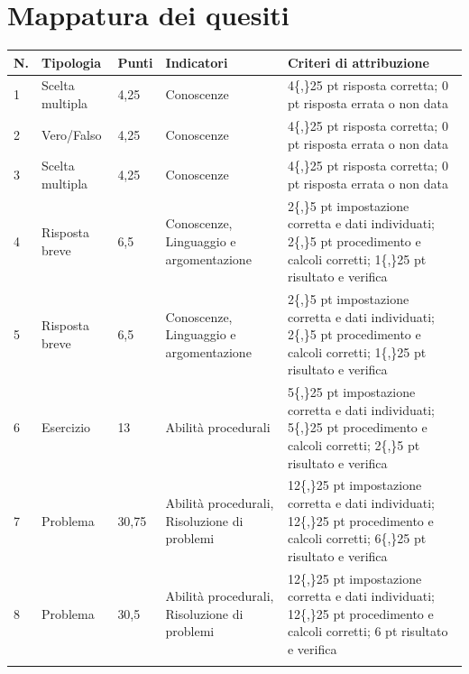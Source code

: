 \documentclass[11pt,a4paper]{article}
\begin{document}
\section*{Mappatura dei quesiti}
{\small
\begin{longtable}{@{}p{0.7cm}p{2.1cm}p{1.2cm}p{3.9cm}p{5.8cm}@{}}
\toprule
\textbf{N.} & \textbf{Tipologia} & \textbf{Punti} & \textbf{Indicatori} & \textbf{Criteri di attribuzione} \\
\midrule
\endhead

1 & Scelta multipla & 4,25 & Conoscenze & 4\{,\}25 pt risposta corretta; 0 pt risposta errata o non data \\
\addlinespace

2 & Vero/Falso & 4,25 & Conoscenze & 4\{,\}25 pt risposta corretta; 0 pt risposta errata o non data \\
\addlinespace

3 & Scelta multipla & 4,25 & Conoscenze & 4\{,\}25 pt risposta corretta; 0 pt risposta errata o non data \\
\addlinespace

4 & Risposta breve & 6,5 & Conoscenze, Linguaggio e argomentazione & 2\{,\}5 pt impostazione corretta e dati individuati; 2\{,\}5 pt procedimento e calcoli corretti; 1\{,\}25 pt risultato e verifica \\
\addlinespace

5 & Risposta breve & 6,5 & Conoscenze, Linguaggio e argomentazione & 2\{,\}5 pt impostazione corretta e dati individuati; 2\{,\}5 pt procedimento e calcoli corretti; 1\{,\}25 pt risultato e verifica \\
\addlinespace

6 & Esercizio & 13 & Abilità procedurali & 5\{,\}25 pt impostazione corretta e dati individuati; 5\{,\}25 pt procedimento e calcoli corretti; 2\{,\}5 pt risultato e verifica \\
\addlinespace

7 & Problema & 30,75 & Abilità procedurali, Risoluzione di problemi & 12\{,\}25 pt impostazione corretta e dati individuati; 12\{,\}25 pt procedimento e calcoli corretti; 6\{,\}25 pt risultato e verifica \\
\addlinespace

8 & Problema & 30,5 & Abilità procedurali, Risoluzione di problemi & 12\{,\}25 pt impostazione corretta e dati individuati; 12\{,\}25 pt procedimento e calcoli corretti; 6 pt risultato e verifica \\
\addlinespace

\bottomrule
\end{longtable}
}
\end{document}
